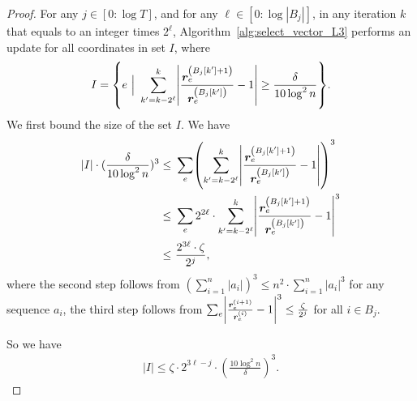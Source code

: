 \documentclass[11pt]{article}
\let\originalleft\left
\let\originalright\right
\renewcommand{\left}{\mathopen{}\mathclose\bgroup\originalleft}
\renewcommand{\right}{\aftergroup\egroup\originalright}
\newcommand\rr{\boldsymbol{\mathit{r}}}
\begin{document}
\begin{proof}
For any $j \in [0: \log T]$, and for any $\ell \in [0: \log |B_j|]$, in any iteration $k$ that equals to an integer times $2^{\ell}$, Algorithm~\ref{alg:select_vector_L3} performs an update for all coordinates in set $I$, where
\begin{align*}
I = \left\{ e ~\Big|~
\sum_{k' = k - 2^{\ell}}^{k} \left|\frac{\rr_e^{\left(B_j[k'] + 1\right)}}{\rr_e^{\left(B_j[k'] \right)}} - 1 \right| \geq \frac{\delta}{10 \log^2 n}\right\}.
\end{align*}
We first bound the size of the set $I$. We have
\begin{align*}
|I| \cdot (\frac{\delta}{10 \log^2 n})^3 \leq &~ \sum_e \left( \sum_{k' = k - 2^{\ell}}^{k} \left|\frac{\rr_e^{\left(B_j[k'] + 1\right)}}{\rr_e^{\left(B_j[k'] \right)}} - 1 \right| \right)^3 \\
\leq &~ \sum_e 2^{2 \ell} \cdot \sum_{k' = k - 2^{\ell}}^{k} \left|\frac{\rr_e^{\left(B_j[k'] + 1\right)}}{\rr_e^{\left(B_j[k'] \right)}} - 1 \right|^3 \\
\leq &~ \frac{2^{3 \ell} \cdot \zeta}{2^j},
\end{align*}
where the second step follows from $(\sum_{i=1}^n |a_i|)^3 \leq n^2 \cdot \sum_{i=1}^n |a_i|^3$ for any sequence $a_i$, the third step follows from $\sum_{e} \left|\frac{\rr_e^{\left(i + 1\right)}}{\rr_e^{\left(i \right)}} - 1 \right|^3 \leq \frac{\zeta}{2^{j}}$ for all $i \in B_j$.

So we have
\begin{align*}
|I| \leq \zeta \cdot 2^{3 \ell-j} \cdot (\frac{10 \log^2 n}{\delta})^3.
\end{align*}



\end{proof}
\end{document}
